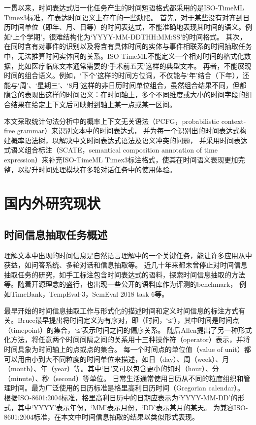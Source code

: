 一贯以来，时间表达式归一化任务产生的时间短语格式都采用的是ISO-TimeML Timex3标准，在表达时间语义上存在的一些缺陷。
首先，对于某些没有对齐到日历时间单位（即年、月、日等）的时间表达式，不能准确地表现其时间的语义。例如‘上个学期’，很难结构化为‘YYYY-MM-DDTHH:MM:SS’的时间格式。
其次，在同时含有对事件的识别以及将含有具体时间的实体与事件相联系的时间抽取任务中，无法推算时间实体间的关系。ISO-TimeML不能定义一个相对时间的格式化数据，比如医疗临床文本通常需要的‘手术前五天’这样的典型文本。
再者，不能展现时间的组合语义。例如，‘下个’这样的时间方位词，不仅能与‘年’结合（下年），还能与‘周’、‘星期三’、‘8月’这样的非日历时间单位组合，虽然组合结果不同，但都隐含的表现出这样的时间语义：在时间轴上，多个不同维度或大小的时间字段的组合结果在给定上下文后可映射到轴上某一点或某一区间。

本文采取统计句法分析中的概率上下文无关语法（PCFG，probabilistic context-free grammar）来识别文本中的时间表达式，
并为每一个识别出的时间表达式构建概率语法树，以解决中文时间表达式语法及语义冲突的问题，
并采用时间表达式语义组合标注\cite{bethard-parker-2016-semantically}（SCATE，semantical composition annotation of time expression）来补充ISO-TimeML Timex3标注格式，使其在时间语义表现更加完整，以提升时间处理模块在多轮对话任务中的使用体验。

\section{国内外研究现状}

\subsection{时间信息抽取任务概述}

理解文本中出现的时间信息是自然语言理解中的一个关键任务，能让许多应用从中获益，如问答系统、多轮对话和信息抽取等。
近几十年来都未曾停止对时间信息抽取任务的研究，如手工标注包含时间表达式的语料，探索时间信息抽取的方法等。随着开源理念的盛行，也出现一些公开的语料库作为评测的benchmark，
例如TimeBank\cite{Pustejovsky03}，TempEval-3\cite{uzzaman-etal-2013-semeval}，SemEval 2018 task 6\cite{laparra-etal-2018-semeval}等。

最早开始的时间信息抽取工作与形式化的描述时间和定义时间信息的标注方式有关。Bruce\cite{bruce1972model}最早提出将时间定义为有序对，即（时间，‘≤’），其中时间是时间点（timepoint）的集合，‘≤’表示时间之间的偏序关系。
随后Allen\cite{allen1983maintaining}提出了另一种形式化方法，将任意两个时间间隔之间的关系用十三种操作符（operator）表示，并将时间具象为时间轴上的点或点的集合。
每一个时间点的单位值（value of unit）都可以用由小到大不同粒度的时间单位来描述，如日（day）、周（week）、月（month）、年（year）等。其中‘日’又可以包含更小的如时（hour）、分（minute）、秒（second）等单位。
日常生活通常使用日历从不同的粒度组织和管理时间。最为广泛使用的日历标准是格里高利日历时间（Gregorian calendar）。
根据ISO-8601:2004标准，格里高利日历中的日期应表示为‘YYYY-MM-DD’的形式，其中‘YYYY’表示年份，‘MM’表示月份，‘DD’表示某月的某天。
为兼容ISO-8601:2004标准，在本文中时间信息抽取的结果以类似形式表现。

